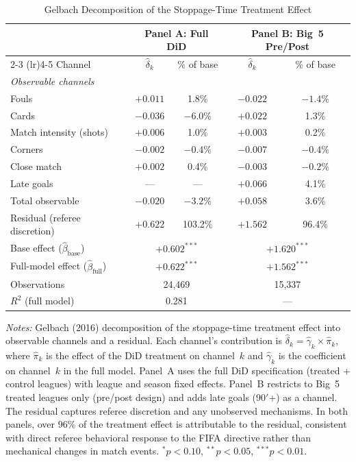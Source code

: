 \begin{table}[htbp]
\centering
\begin{threeparttable}
\caption{Gelbach Decomposition of the Stoppage-Time Treatment Effect}
\label{tab:mechanism}
\begin{tabular}{lcccc}
\toprule
& \multicolumn{2}{c}{Panel A: Full DiD} & \multicolumn{2}{c}{Panel B: Big~5 Pre/Post} \\
\cmidrule(lr){2-3} \cmidrule(lr){4-5}
Channel & $\hat{\delta}_k$ & \% of base & $\hat{\delta}_k$ & \% of base \\
\midrule
\multicolumn{5}{l}{\textit{Observable channels}} \\[3pt]
Fouls          & $+0.011$  & 1.8\%   & $-0.022$ & $-1.4$\% \\
Cards          & $-0.036$  & $-6.0$\% & $+0.022$ & 1.3\%   \\
Match intensity (shots) & $+0.006$  & 1.0\%   & $+0.003$ & 0.2\%   \\
Corners        & $-0.002$  & $-0.4$\% & $-0.007$ & $-0.4$\% \\
Close match    & $+0.002$  & 0.4\%   & $-0.003$ & $-0.2$\% \\
Late goals     & ---       & ---     & $+0.066$ & 4.1\%   \\[3pt]
\midrule
Total observable  & $-0.020$ & $-3.2$\% & $+0.058$ & 3.6\% \\
Residual (referee discretion) & $+0.622$ & 103.2\% & $+1.562$ & 96.4\% \\[3pt]
\midrule
Base effect ($\hat{\beta}_{\text{base}}$) & \multicolumn{2}{c}{$+0.602^{***}$} & \multicolumn{2}{c}{$+1.620^{***}$} \\
Full-model effect ($\hat{\beta}_{\text{full}}$) & \multicolumn{2}{c}{$+0.622^{***}$} & \multicolumn{2}{c}{$+1.562^{***}$} \\
Observations & \multicolumn{2}{c}{24,469} & \multicolumn{2}{c}{15,337} \\
$R^2$ (full model) & \multicolumn{2}{c}{0.281} & \multicolumn{2}{c}{---} \\
\bottomrule
\end{tabular}
\begin{tablenotes}[flushleft]
\footnotesize
\item \textit{Notes:} Gelbach (2016) decomposition of the stoppage-time treatment effect
into observable channels and a residual. Each channel's contribution is
$\hat{\delta}_k = \hat{\gamma}_k \times \hat{\pi}_k$, where $\hat{\pi}_k$ is the
effect of the DiD treatment on channel~$k$ and $\hat{\gamma}_k$ is the coefficient on
channel~$k$ in the full model. Panel~A uses the full DiD specification (treated + control
leagues) with league and season fixed effects. Panel~B restricts to Big~5 treated leagues
only (pre/post design) and adds late goals (90$'$+) as a channel. The residual captures
referee discretion and any unobserved mechanisms. In both panels, over 96\% of the
treatment effect is attributable to the residual, consistent with direct referee
behavioral response to the FIFA directive rather than mechanical changes in match events.
$^{*}p<0.10$, $^{**}p<0.05$, $^{***}p<0.01$.
\end{tablenotes}
\end{threeparttable}
\end{table}
